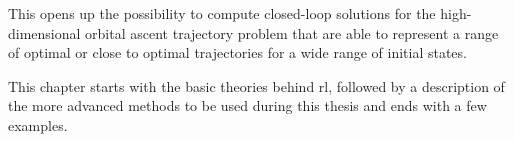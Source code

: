 This opens up the possibility to compute closed-loop solutions for the high-dimensional orbital ascent trajectory problem that are able to represent a range of optimal or close to optimal trajectories for a wide range of initial states.

This chapter starts with the basic theories behind \acrlong{rl}, followed by a description of the more advanced methods to be used during this thesis and ends with a few examples.
